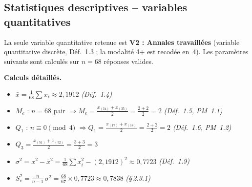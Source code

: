 
\subsection{Statistiques descriptives -- variables quantitatives}

La seule variable quantitative retenue est \textbf{V2 : Annales travaillées}
(variable quantitative discrète, Déf.~1.3 ; la modalité \og{}4+\fg{} est recodée
en~4). Les paramètres suivants sont calculés sur \(n = 68\) réponses valides.

\begin{table}[H]
  \centering
  \caption{Paramètres descriptifs de V2 : Annales travaillées (\(n = 68\))}
  \label{tab:desc_v2}
\end{table}

\noindent\textbf{Calculs détaillés.}
\begin{itemize}
  \item \(\bar{x} = \tfrac{1}{68}\sum x_i \approx 2{,}1912\) \emph{(Déf.~1.4)}
  \item \(M_e\) : \(n = 68\) pair \(\Rightarrow M_e = \tfrac{x_{(34)} + x_{(35)}}{2} = \tfrac{2+2}{2} = 2\)
        \emph{(Déf.~1.5, PM~1.1)}
  \item \(Q_1\) : \(n \equiv 0 \pmod{4}\) \(\Rightarrow Q_1 = \tfrac{x_{(17)} + x_{(18)}}{2} = \tfrac{2+2}{2} = 2\)
        \emph{(Déf.~1.6, PM~1.2)}
  \item \(Q_3 = \tfrac{x_{(51)} + x_{(52)}}{2} = \tfrac{3+3}{2} = 3\)
  \item \(\sigma^2 = \overline{x^2} - \bar{x}^2 = \tfrac{1}{68}\sum x_i^2 - (2{,}1912)^2 \approx 0{,}7723\)
        \emph{(Déf.~1.9)}
  \item \(S_e^2 = \tfrac{n}{n-1}\,\sigma^2 = \tfrac{68}{67}\times 0{,}7723 \approx 0{,}7838\)
        \emph{(§\,2.3.1)}
\end{itemize}


